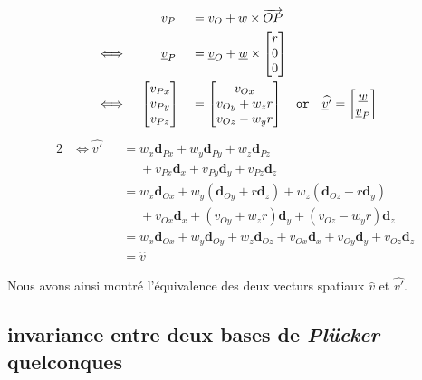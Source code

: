 {%
\begin{alignat*}{3}
  & &&\phantom{xxx} v_{P} &&= v_{O} + w \times \overrightarrow{OP} \\
  \vspace{0.5cm}
  &\iff &&\phantom{xxx} \underline{v}_{P}
  &&=
  \underline{v}_{O}+\underline{w}\times
  \begin{bmatrix}
    r\\
    0\\
    0
  \end{bmatrix} \\
  \vspace{0.5cm}
  &\iff
  &&\begin{bmatrix}
    v_{Px} \\
    v_{Py} \\
    v_{Pz}
  \end{bmatrix}
  &&=
  \begin{bmatrix}
    v_{Ox}\\
    v_{Oy}+w_{z}r\\
    v_{Oz}-w_{y}r
  \end{bmatrix}
  \quad \texttt{or} \quad
  \widehat{\underline{v}'}
  =
  \begin{bmatrix}
    \underline{w} \\
    \underline{v}_{P}
  \end{bmatrix}
\end{alignat*}
}
{%
\begin{alignat*}{2}
  &\iff
  \widehat{v'} &&= w_{x}\textbf{d}_{Px} + w_{y}\textbf{d}_{Py} + w_{z}\textbf{d}_{Pz} \\
  &            &&\phantom{{}={}} + v_{Px}\textbf{d}_{x} + v_{Py}\textbf{d}_{y} + v_{Pz}\textbf{d}_{z} \\
  &            &&= w_{x}\textbf{d}_{Ox} + w_{y}(\textbf{d}_{Oy}+r\textbf{d}_{z}) + w_{z}(\textbf{d}_{Oz}-r\textbf{d}_{y}) \\
  &            &&\phantom{{}={}} + v_{Ox}\textbf{d}_{x} + (v_{Oy}+w_{z}r)\textbf{d}_{y} + (v_{Oz}-w_{y}r)\textbf{d}_{z} \\
  &            &&= w_{x}\textbf{d}_{Ox} + w_{y}\textbf{d}_{Oy} + w_{z}\textbf{d}_{Oz} + v_{Ox}\textbf{d}_{x} + v_{Oy}\textbf{d}_{y} + v_{Oz}\textbf{d}_{z} \\
  &            &&= \widehat{v}
\end{alignat*}
}
{}

Nous avons ainsi montré l'équivalence des deux vecturs spatiaux $\widehat{v}$ et $\widehat{v'}$.

\subsection{invariance entre deux bases de \emph{Plücker} quelconques}


